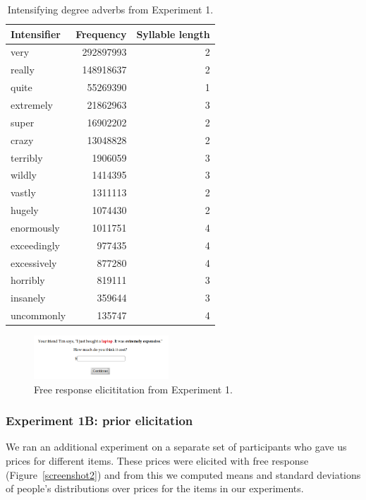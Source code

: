 \documentclass[10pt,letterpaper]{article}
\begin{document}
      \begin{table}[!ht]
      \begin{center} 
      \caption{Intensifying degree adverbs from Experiment 1.} 
      \label{intensifiers-table} 
      \vskip 0.12in
      \begin{tabular}{lrr} 
      \hline
      Intensifier    &  Frequency & Syllable length \\
      \hline
      very & 292897993 & 2 \\ 
      really & 148918637 & 2 \\ 
      quite & 55269390 & 1 \\ 
      extremely & 21862963 & 3 \\ 
      super & 16902202 & 2 \\ 
      crazy & 13048828 & 2 \\ 
      terribly & 1906059 & 3 \\ 
      wildly & 1414395 & 3 \\ 
      vastly & 1311113 & 2 \\ 
      hugely & 1074430 & 2 \\ 
      enormously & 1011751 & 4 \\ 
      exceedingly & 977435 & 4 \\ 
      excessively & 877280 & 4 \\ 
      horribly & 819111 & 3 \\ 
      insanely & 359644 & 3 \\ 
      uncommonly & 135747 & 4 \\
      \hline
      \end{tabular} 
      \end{center} 
      \end{table}
    
      \begin{figure}[ht]
      \begin{center}
      \includegraphics[width=0.45\textwidth]{screenshot.png}
      \end{center}
      \caption{Free response elicititation from Experiment 1.}
      \label{screenshot-figure}
      \end{figure}
      
    \subsubsection{Experiment 1B: prior elicitation}
      We ran an additional experiment on a separate set of participants who gave us prices for different items. These prices were elicited with free response (Figure~\ref{screenshot2}) and from this we computed means and standard deviations of people's distributions over prices for the items in our experiments.
      
\end{document}
